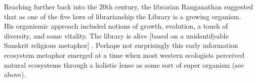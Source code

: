 Reaching further back into the 20th century, the librarian Ranganathan suggested that as one of the five laws of librarianship the Library is a growing organism. His organismic approach included notions of growth, evolution, a touch of diversity, and some vitality. The library is alive [based on a unidentifyable Sanskrit religious metaphor] \cite{ranganathan_1931}. Perhaps not surprisingly this early information ecosystem metaphor emerged at a time when most western ecologists perceived natural ecosystems through a holistic lense as some sort of super organism (see above).
